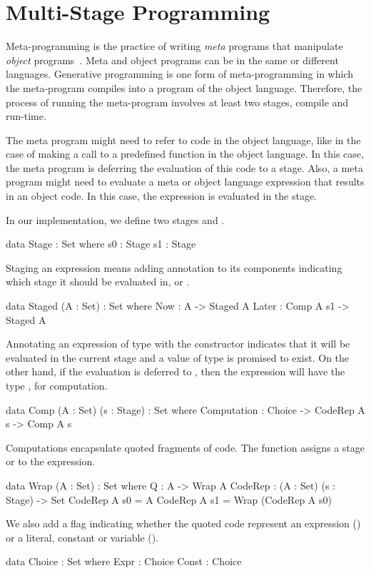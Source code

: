 \section{Multi-Stage Programming}
\label{sec:background:msp}
Meta-programming is the practice of writing \emph{meta} programs that manipulate \emph{object} programs~\cite{sheard2001Challenges, sheard2002TH,metaProg2019Survey}. Meta and object programs can be in the same or different languages. Generative programming is one form of meta-programming in which the meta-program compiles into a program of the object language. Therefore, the process of running the meta-program involves at least two stages, compile and run-time. 

The meta program might need to refer to code in the object language, like in the case of making a call to a predefined function in the object language. In this case, the meta program is deferring the evaluation of this code to a  stage. 
Also, a meta program might need to evaluate a meta or object language expression that results in an object code. In this case, the expression is evaluated in the  stage. 

In our implementation, we define two stages  and . 
\begin{togcode}
data Stage : Set where
  s0 : Stage
  s1 : Stage
\end{togcode} 

Staging an expression means adding annotation to its components indicating which stage it should be evaluated in, 
 or . 
\begin{togcode} 
data Staged (A : Set) : Set where
  Now : A -> Staged A
  Later : Comp A s1 -> Staged A
\end{togcode} 
Annotating an expression of type  with the  constructor indicates that it will be evaluated in the current stage and a value of type  is promised to exist. On the other hand, if the evaluation is deferred to , then the expression will have the type , for computation. 
\begin{togcode} 
data Comp (A : Set) (s : Stage) : Set where
  Computation : Choice -> CodeRep A s -> Comp A s
\end{togcode} 
Computations encapsulate quoted fragments of code. The  function assigns a stage  or  to the expression. 
\begin{togcode} 
data Wrap (A : Set) : Set where
  Q : A -> Wrap A
CodeRep : (A : Set) (s : Stage) -> Set
  CodeRep A s0 = A
  CodeRep A s1 = Wrap (CodeRep A s0)
\end{togcode} 
We also add a flag indicating whether the quoted code represent an expression () or a literal, constant or variable ().  
\begin{togcode} 
data Choice : Set where
  Expr : Choice
  Const : Choice
\end{togcode} 


